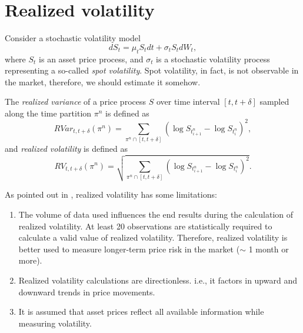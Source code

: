 \section{Realized volatility}
    Consider a stochastic volatility model 
    \begin{equation}\label{model:SVM}
        dS_t = \mu_t S_t dt + \sigma_t S_tdW_t,
    \end{equation}
    where $S_t$ is an asset price process, and $\sigma_t$ is a stochastic volatility process representing a so-called \emph{spot volatility}.
    Spot volatility, in fact, is not observable in the market, therefore, we should estimate it somehow.

    \begin{definition}
        The \emph{realized variance} of a price process $S$ over time interval $[t, t + \delta]$ sampled along the time partition $\pi^n$
        is defined as 
        \begin{equation}\label{def:RV}
            RVar_{t, t + \delta}(\pi^n) = \sum_{\pi^n \cap [t, t + \delta]} \left(\log S_{t^n_{i+1}} - \log S_{t^n_{i}}\right)^2,
        \end{equation}
        and \emph{realized volatility} is defined as
        \begin{equation}\label{def:RVol}
            RV_{t, t + \delta}(\pi^n) = \sqrt{\sum_{\pi^n \cap [t, t + \delta]} \left(\log S_{t^n_{i+1}} - \log S_{t^n_{i}}\right)^2}.
        \end{equation}
    \end{definition}
    As pointed out in \cite{rvol_wsm}, realized volatility has some limitations:
    \begin{enumerate}
        \item The volume of data used influences the end results during the calculation of realized volatility. At least 20 observations are statistically required to calculate a valid value of realized volatility. Therefore, realized volatility is better used to measure longer-term price risk in the market ($\sim$ 1 month or more).
        \item Realized volatility calculations are directionless. i.e., it factors in upward and downward trends in price movements.
        \item It is assumed that asset prices reflect all available information while measuring volatility.
    \end{enumerate}


